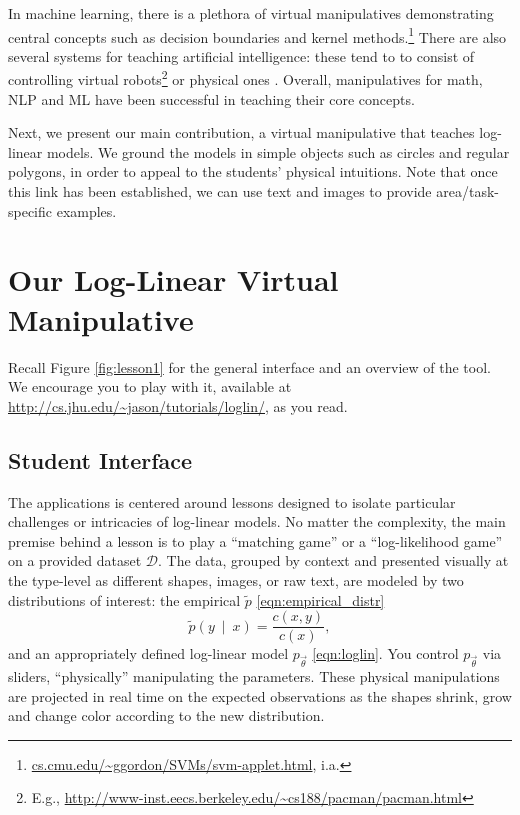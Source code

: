\documentclass[11pt,letterpaper]{article}
\newcommand{\empirical}[0]{\ensuremath{\tilde{p}}}
\newcommand{\Data}[0]{\ensuremath{\mathcal{D}}}
\newcommand{\WhereToFind}[0]{\url{http://cs.jhu.edu/~jason/tutorials/loglin/}}
\begin{document}
In machine learning, there is a plethora of virtual manipulatives demonstrating central concepts such 
as decision boundaries and kernel methods.\footnote{\url{cs.cmu.edu/~ggordon/SVMs/svm-applet.html}, i.a.} 
There are also several systems for teaching artificial intelligence: these tend to to consist of controlling 
virtual robots\footnote{E.g., \url{http://www-inst.eecs.berkeley.edu/~cs188/pacman/pacman.html}}
or physical ones \cite{tokic2012robot}.
Overall, manipulatives for math, NLP and ML have been successful in teaching their core concepts. 

Next, we present our main contribution, a virtual manipulative that teaches log-linear models. We ground 
the models in simple objects such as circles and regular polygons, in order to appeal to the 
students' physical intuitions. Note that once this link has been established, we can use text and images to 
provide area/task-specific examples.


\section{Our Log-Linear Virtual Manipulative}\label{sec:overview}

Recall Figure \ref{fig:lesson1} for the general interface and an overview 
of the tool. We encourage you to play with it, available at 
\WhereToFind{}, as you read.



\subsection{Student Interface}

The applications is centered around lessons designed to isolate particular 
challenges or intricacies of log-linear models. No matter the complexity, the main
premise behind a lesson is to play a ``matching
game'' or a ``log-likelihood game'' on a provided dataset \Data{}. The
data, grouped by context and presented visually at the type-level as
different shapes, images, or raw text, are modeled by two
distributions of interest: the empirical $\tilde{p}$
\eqref{eqn:empirical_distr}
\begin{equation}
\empirical\left(y\ \mid\ x\right) = \frac{c(x,y)}{c(x)},
\label{eqn:empirical_distr}
\end{equation} 
and an appropriately defined log-linear
model $p_{\vec{\theta}}$ \eqref{eqn:loglin}. You control $p_{\vec{\theta}}$ 
via sliders, ``physically'' manipulating the parameters. These physical 
manipulations are projected in real time on the expected observations as the 
shapes shrink, grow and change color according to the new distribution. 
\end{document}
